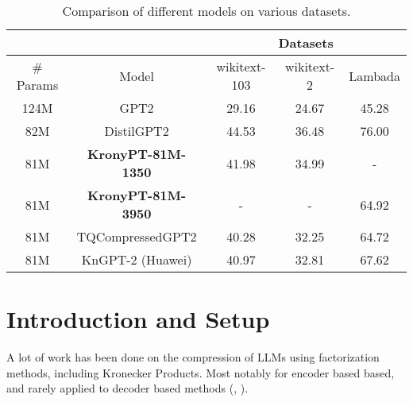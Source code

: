 \documentclass{article}
\begin{document}
\begin{table}[h]
\centering
\begin{tabular}{|c|c|c|c|c|}
\hline
 & & \multicolumn{3}{c|}{Datasets} \\ \hline
\# Params &  Model            & wikitext-103 & wikitext-2 & Lambada \\ \hline
124M      & GPT2              & 29.16        & 24.67      & 45.28      \\ \hline
82M       & DistilGPT2        & 44.53        & 36.48      & 76.00      \\ \hline
81M       & \textbf{KronyPT-81M-1350}  & 41.98        & 34.99      & -          \\ \hline
81M       & \textbf{KronyPT-81M-3950}  & -            & -          & 64.92      \\ \hline
81M       & TQCompressedGPT2  & 40.28        & 32.25      & 64.72      \\ \hline
81M       & KnGPT-2 (Huawei)  & 40.97        & 32.81      & 67.62      \\ \hline
\end{tabular}
\caption{Comparison of different models on various datasets.}
\end{table}



\section{Introduction and Setup}
\label{sec:Introduction and Setup}


A lot of work has been done on the compression of LLMs using factorization methods, including Kronecker Products. Most notably for encoder based based, and rarely applied to decoder based methods (\cite{tahaei2022kroneckerbert}, \cite{edalati2021kroneckr}).

\begin{comment}
To the best of our knowledge, not many have focused on Freezing the initial pre-trained weights, i.e., most methods drop newly factorized matrices into the already pre-trained parameters, without carefully blending, nor assessing/studying how much the model is relying on already trained weights.

In this work:

\begin{itemize}
	\item   We investigate the impact of freezing on the quality of learning,  and also demonstrate the capacity for the network to just not rely on the new weights, and just use the already pre-trained one. 
	\item We also introduce a new distillation / training mechanism to ease the entry of these factorized weights into the old architecture. 
	\item We also show that freezing the other weights, helps the new introduced get more activation.
\end{itemize}

\end{comment}
\end{document}
